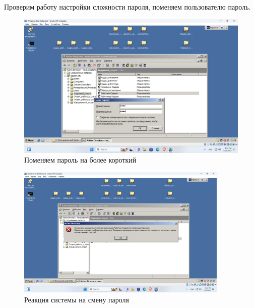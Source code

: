 Проверим работу настройки сложности пароля, поменяем пользователю пароль.
\begin{figure}[H]
  \centering
  \includegraphics[width=1\textwidth]{pict/prac/50}
  \caption{Поменяем пароль на более короткий}
  \label{fig:50}
\end{figure}

\begin{figure}[H]
  \centering
  \includegraphics[width=0.9\textwidth]{pict/prac/51}
  \caption{Реакция системы на смену пароля}
  \label{fig:51}
\end{figure}

